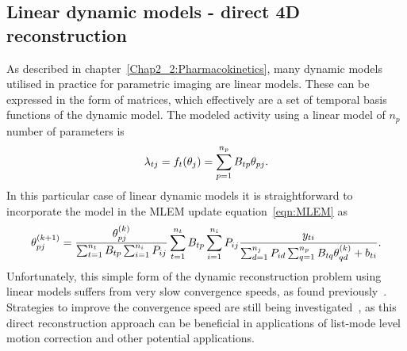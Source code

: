 \subsection{Linear dynamic models - direct 4D reconstruction}
As described in chapter~\ref{Chap2_2:Pharmacokinetics}, many dynamic models utilised in practice for parametric imaging are linear models. These can be expressed in the form of matrices, which effectively are a set of temporal basis functions of the dynamic model.
The modeled activity using a linear model of $n_p$ number of parameters is
\begin{equation}
\lambda_{tj} = f_t(\theta_{j}) = \sum_{p=1}^{n_p} B_{tp}   \theta_{pj} \\ . \\
\label{eqn:2_3_LinearBasis}
\end{equation}
In this particular case of linear dynamic models it is straightforward to incorporate the model in the MLEM update equation~\ref{eqn:MLEM} as
%
%
%
\begin{equation}
\theta_{pj}^{(k+1)} = \frac{\theta_{pj}^{(k)}}
{\sum_{t=1}^{n_t} B_{tp} \sum_{i=1}^{n_i} P_{ij}} 
\sum_{t=1}^{n_t} B_{tp} \sum_{i=1}^{n_i} P_{ij}
\frac{y_{ti}}
{\sum_{d=1}^{n_j} P_{id} \sum_{q=1}^{n_p} B_{tq}\theta_{qd}^{(k)} + b_{ti} } \\.
\label{eqn:4DMLEM}
\end{equation} 
%
Unfortunately, this simple form of the dynamic reconstruction problem using linear models suffers from very slow convergence speeds, as found previously~\cite{Carson1985,Matthews1995}. Strategies to improve the convergence speed are still being investigated~\cite{Gallezot2018}, as this direct reconstruction approach can be beneficial in applications of list-mode level motion correction and other potential applications.
%
